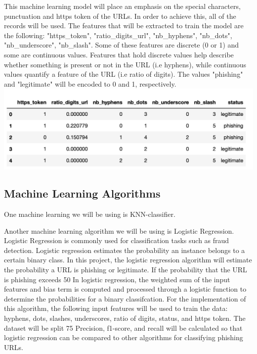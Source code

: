 \documentclass[conference]{IEEEtran}
\begin{document}
This machine learning model will place an emphasis on the special characters, punctuation and https token of the URLs. In order to achieve this, all of the records will be used. The features that will be extracted to train the model are the following: "https_token", "ratio_digits_url", "nb_hyphens", "nb_dots", "nb_underscore", "nb_slash". Some of these features are discrete (0 or 1) and some are continuous values. Features that hold discrete values help describe whether something is present or not in the URL (i.e hyphens), while continuous values quantify a feature of the URL (i.e ratio of digits). The values "phishing" and "legitimate" will be encoded to 0 and 1, respectively. 
\includegraphics{dataset.png}

\subsection{Machine Learning Algorithms}
One machine learning we will be using is KNN-classifier. 

Another machine learning algorithm we will be using is Logistic Regression. Logistic Regression is commonly used for classification tasks such as fraud detection. Logistic regression estimates the probability an instance belongs to a certain binary class. In this project, the logistic regression algorithm will estimate the probability a URL is phishing or legitimate. 
If the probability that the URL is phishing exceeds 50%
In logistic regression, the weighted sum of the input features and bias term is computed and processed through a logistic function to determine the probabilities for a binary classifcation. For the implementation of this algorithm, the following input features will be used to train the data: hyphens, dots, slashes, underscores, ratio of digits, status, and https token. The dataset will be split 75%
Precision, f1-score, and recall will be calculated so that logistic regression can be compared to other algorithms for classifying phishing URLs.  
\end{document}
